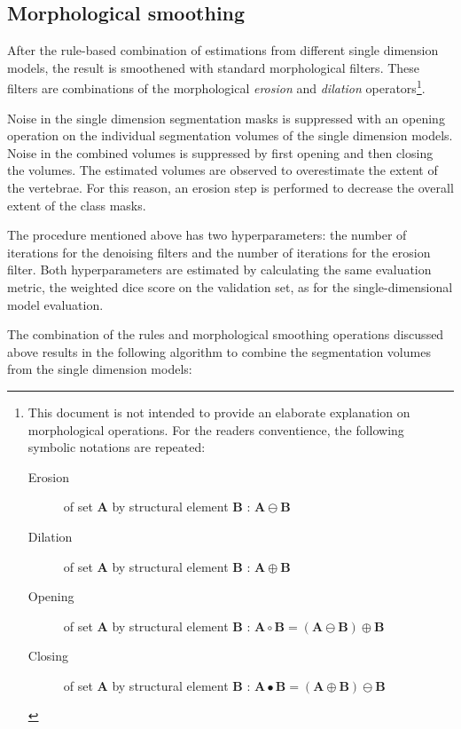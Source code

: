\subsection{Morphological smoothing}
After the rule-based combination of estimations from different single dimension models, the result is smoothened with standard morphological filters.
These filters are combinations of the morphological \textit{erosion} and \textit{dilation} operators\footnote{
    This document is not intended to provide an elaborate explanation on morphological operations.
    For the readers conventience, the following symbolic notations are repeated:
    \begin{description}
        \item[Erosion] of set $\mathbf{A}$ by structural element $\mathbf{B}$ : $\mathbf{A} \ominus \mathbf{B}$ 
        \item[Dilation] of set $\mathbf{A}$ by structural element $\mathbf{B}$ : $\mathbf{A} \oplus \mathbf{B}$ 
        \item[Opening] of set $\mathbf{A}$ by structural element $\mathbf{B}$ : $\mathbf{A} \circ \mathbf{B} = (\mathbf{A} \ominus \mathbf{B}) \oplus \mathbf{B}$
        \item[Closing] of set $\mathbf{A}$ by structural element $\mathbf{B}$ : $\mathbf{A} \bullet \mathbf{B} = (\mathbf{A} \oplus \mathbf{B}) \ominus \mathbf{B}$
    \end{description}
}.
\par{
    Noise in the single dimension segmentation masks is suppressed with an opening operation on the individual segmentation volumes of the single dimension models.
    Noise in the combined volumes is suppressed by first opening and then closing the volumes.
    The estimated volumes are observed to overestimate the extent of the vertebrae. For this reason, an erosion step is performed to decrease the overall extent of the class masks.
}
\par{
    The procedure mentioned above has two hyperparameters: the number of iterations for the denoising filters and the number of iterations for the erosion filter.
    Both hyperparameters are estimated by calculating the same evaluation metric, the weighted dice score on the validation set, as for the single-dimensional model evaluation. 
    
    The combination of the rules and morphological smoothing operations discussed above results in the following algorithm to combine the segmentation volumes from the single dimension models:
}
\newline
